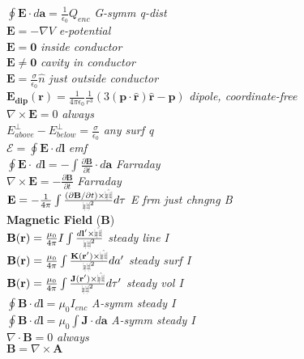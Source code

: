 \documentclass[9pt]{extarticle}
\def\rcurs{{\mbox{$\resizebox{.09in}{.08in}{\texttt{[image: ScriptR]}}$}}}
\def\brcurs{{\mbox{$\resizebox{.09in}{.08in}{\texttt{[image: BoldR]}}$}}}
\begin{document}
\begin{multicols}{3}
$\oint\mathbf{E}\cdot d\mathbf{a} = \frac{1}{\epsilon_{0}}Q_{enc}$ \textit{G-symm q-dist} \\
$\mathbf{E} = -\nabla V$ \textit{e-potential} \\
$\mathbf{E} = \mathbf{0}$ \textit{inside conductor} \\
$\mathbf{E} \neq \mathbf{0}$ \textit{cavity in conductor} \\
$\mathbf{E} = \frac{\sigma}{\epsilon_{0}}\hat{n}$ \textit{just outside conductor} \\
$\mathbf{E_{dip}}(\mathbf{r}) = \frac{1}{4\pi\epsilon_{0}}\frac{1}{r^{3}}(3(\mathbf{p}\cdot\mathbf{\hat{r}})\mathbf{\hat{r}} - \mathbf{p})$ \textit{dipole, coordinate-free} \\
$\nabla\times\mathbf{E} = 0$ \textit{always} \\
$E^{\perp}_{above} - E^{\perp}_{below} = \frac{\sigma}{\epsilon_{0}}$ \textit{any surf q} \\
$\mathcal{E} = \oint\mathbf{E}\cdot d\mathbf{l}$ \textit{emf} \\
$\oint\mathbf{E}\cdot\ d\mathbf{l} = -\int\frac{\partial\mathbf{B}}{\partial t}\cdot d\mathbf{a}$ \textit{Farraday} \\
$\nabla\times\mathbf{E} = -\frac{\partial\mathbf{B}}{\partial t}$ \textit{Farraday} \\
$\mathbf{E} = -\frac{1}{4\pi}\int\frac{(\partial\mathbf{B}/\partial t)\times\hat{\brcurs}}{\rcurs^{2}}d\tau$ \textit{E frm just chngng B} \\
\textbf{Magnetic Field} ($\mathbf{B}$) \\
$\mathbf{B}(\mathbf{r}) = \frac{\mu_{0}}{4\pi}I\int\frac{d\mathbf{l}'\times\hat{\brcurs}}{\rcurs^{2}}$ \textit{steady line I} \\
$\mathbf{B}(\mathbf{r}) = \frac{\mu_{0}}{4\pi}\int\frac{\mathbf{K}(\mathbf{r}')\times\hat{\brcurs}}{\rcurs^{2}}da'$ \textit{steady surf I} \\
$\mathbf{B}(\mathbf{r}) = \frac{\mu_{0}}{4\pi}\int\frac{\mathbf{J}(\mathbf{r}')\times\hat{\brcurs}}{\rcurs^{2}}d\tau'$ \textit{steady vol I} \\
$\oint\mathbf{B}\cdot d\mathbf{l} = \mu_{0}I_{enc}$ \textit{A-symm steady I} \\
$\oint\mathbf{B}\cdot d\mathbf{l} = \mu_{0}\int\mathbf{J}\cdot d\mathbf{a}$ \textit{A-symm steady I} \\
$\nabla\cdot\mathbf{B} = 0$ \textit{always} \\
$\mathbf{B} = \nabla\times\mathbf{A}$  \\

\end{multicols}
\end{document}
